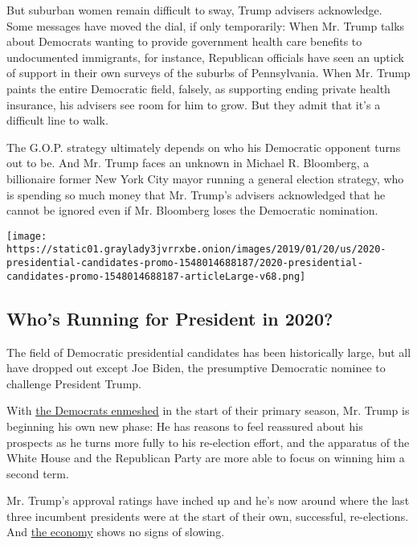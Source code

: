 But suburban women remain difficult to sway, Trump advisers acknowledge.
Some messages have moved the dial, if only temporarily: When Mr. Trump
talks about Democrats wanting to provide government health care benefits
to undocumented immigrants, for instance, Republican officials have seen
an uptick of support in their own surveys of the suburbs of
Pennsylvania. When Mr. Trump paints the entire Democratic field,
falsely, as supporting ending private health insurance, his advisers see
room for him to grow. But they admit that it's a difficult line to walk.

The G.O.P. strategy ultimately depends on who his Democratic opponent
turns out to be. And Mr. Trump faces an unknown in Michael R. Bloomberg,
a billionaire former New York City mayor running a general election
strategy, who is spending so much money that Mr. Trump's advisers
acknowledged that he cannot be ignored even if Mr. Bloomberg loses the
Democratic nomination.

\href{https://www.nytimes3xbfgragh.onion/interactive/2019/us/politics/2020-presidential-candidates.html}{}

\texttt{[image: https://static01.graylady3jvrrxbe.onion/images/2019/01/20/us/2020-presidential-candidates-promo-1548014688187/2020-presidential-candidates-promo-1548014688187-articleLarge-v68.png]}

\hypertarget{whos-running-for-president-in-2020}{%
\subsection{Who's Running for President in
2020?}\label{whos-running-for-president-in-2020}}

The field of Democratic presidential candidates has been historically
large, but all have dropped out except Joe Biden, the presumptive
Democratic nominee to challenge President Trump.

With
\href{https://www.nytimes3xbfgragh.onion/2020/02/06/us/politics/democratic-iowa-caucuses.html}{the
Democrats enmeshed} in the start of their primary season, Mr. Trump is
beginning his own new phase: He has reasons to feel reassured about his
prospects as he turns more fully to his re-election effort, and the
apparatus of the White House and the Republican Party are more able to
focus on winning him a second term.

Mr. Trump's approval ratings have inched up and he's now around where
the last three incumbent presidents were at the start of their own,
successful, re-elections. And
\href{https://www.nytimes3xbfgragh.onion/2020/02/07/upshot/election-year-economy-trump.html}{the
economy} shows no signs of slowing.

